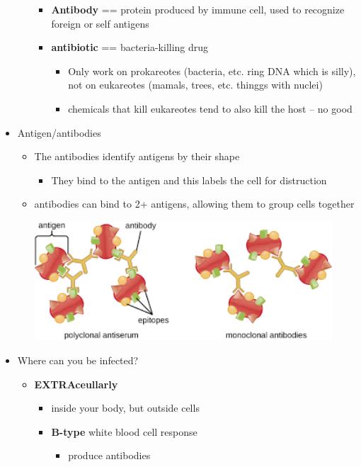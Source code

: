 \documentclass{article}
\theoremstyle{definition}
\begin{document}
\begin{itemize}
\begin{itemize}
\begin{itemize}
					\item \textbf{Antibody}  == protein produced by immune cell, used to recognize foreign or self antigens
					\item \textbf{antibiotic}  == bacteria-killing drug
						\begin{itemize}
							\item Only work on prokareotes (bacteria, etc. ring DNA which is silly), not on eukareotes (mamals, trees, etc. thinggs with nuclei)
							\item chemicals that kill eukareotes tend to also kill the host -- no good
						\end{itemize}
				\end{itemize}
		\end{itemize}
	\item Antigen/antibodies
		\begin{itemize}
			\item The antibodies identify antigens by their shape
				\begin{itemize}
					\item They bind to the antigen and this labels the cell for distruction
				\end{itemize}
			\item antibodies can bind to 2+ antigens, allowing them to group cells together
				\begin{center}
					\includegraphics[width=30em]{antibody}
				\end{center}
		\end{itemize}
	\item Where can you be infected?
		\begin{itemize}
			\item \textbf{EXTRAceullarly}
				\begin{itemize}
					\item inside your body, but outside cells
					\item \textbf{B-type} white blood cell response
						\begin{itemize}
							\item produce antibodies

\end{itemize}
\end{itemize}
\end{itemize}
\end{itemize}
\end{document}
